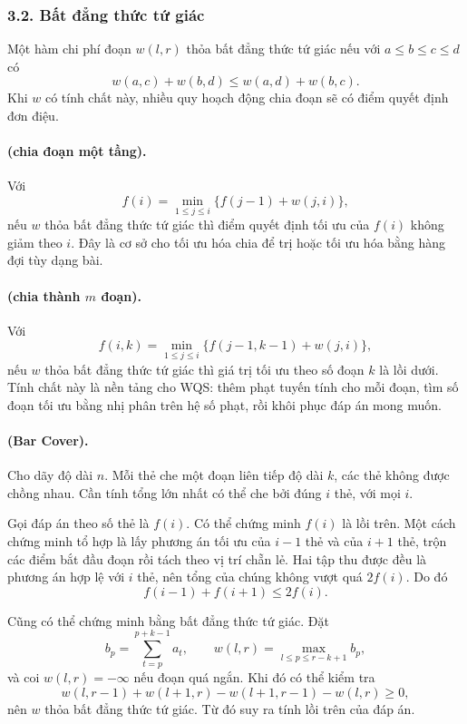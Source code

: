 \documentclass[11pt]{article}
\begin{document}
\subsubsection*{3.2. Bất đẳng thức tứ giác}

Một hàm chi phí đoạn $w(l,r)$ thỏa bất đẳng thức tứ giác nếu với
$a\le b\le c\le d$ có
\[
  w(a,c)+w(b,d)\le w(a,d)+w(b,c).
\]
Khi $w$ có tính chất này, nhiều quy hoạch động chia đoạn sẽ có điểm quyết định
đơn điệu.

\paragraph{ (chia đoạn một tầng).}
Với
\[
  f(i)=\min_{1\le j\le i}\{f(j-1)+w(j,i)\},
\]
nếu $w$ thỏa bất đẳng thức tứ giác thì điểm quyết định tối ưu của $f(i)$ không
giảm theo $i$. Đây là cơ sở cho tối ưu hóa chia để trị hoặc tối ưu hóa bằng
hàng đợi tùy dạng bài.

\paragraph{ (chia thành $m$ đoạn).}
Với
\[
  f(i,k)=\min_{1\le j\le i}\{f(j-1,k-1)+w(j,i)\},
\]
nếu $w$ thỏa bất đẳng thức tứ giác thì giá trị tối ưu theo số đoạn $k$ là lồi
dưới. Tính chất này là nền tảng cho WQS: thêm phạt tuyến tính cho mỗi đoạn,
tìm số đoạn tối ưu bằng nhị phân trên hệ số phạt, rồi khôi phục đáp án mong
muốn.

\paragraph{ (Bar Cover).}
Cho dãy độ dài $n$. Mỗi thẻ che một đoạn liên tiếp độ dài $k$, các thẻ không
được chồng nhau. Cần tính tổng lớn nhất có thể che bởi đúng $i$ thẻ, với mọi
$i$.

Gọi đáp án theo số thẻ là $f(i)$. Có thể chứng minh $f(i)$ là lồi trên. Một
cách chứng minh tổ hợp là lấy phương án tối ưu của $i-1$ thẻ và của $i+1$ thẻ,
trộn các điểm bắt đầu đoạn rồi tách theo vị trí chẵn lẻ. Hai tập thu được đều
là phương án hợp lệ với $i$ thẻ, nên tổng của chúng không vượt quá $2f(i)$.
Do đó
\[
  f(i-1)+f(i+1)\le 2f(i).
\]

Cũng có thể chứng minh bằng bất đẳng thức tứ giác. Đặt
\[
  b_p=\sum_{t=p}^{p+k-1} a_t,\qquad
  w(l,r)=\max_{l\le p\le r-k+1} b_p,
\]
và coi $w(l,r)=-\infty$ nếu đoạn quá ngắn. Khi đó có thể kiểm tra
\[
  w(l,r-1)+w(l+1,r)-w(l+1,r-1)-w(l,r)\ge 0,
\]
nên $w$ thỏa bất đẳng thức tứ giác. Từ đó suy ra tính lồi trên của đáp án.
\end{document}
